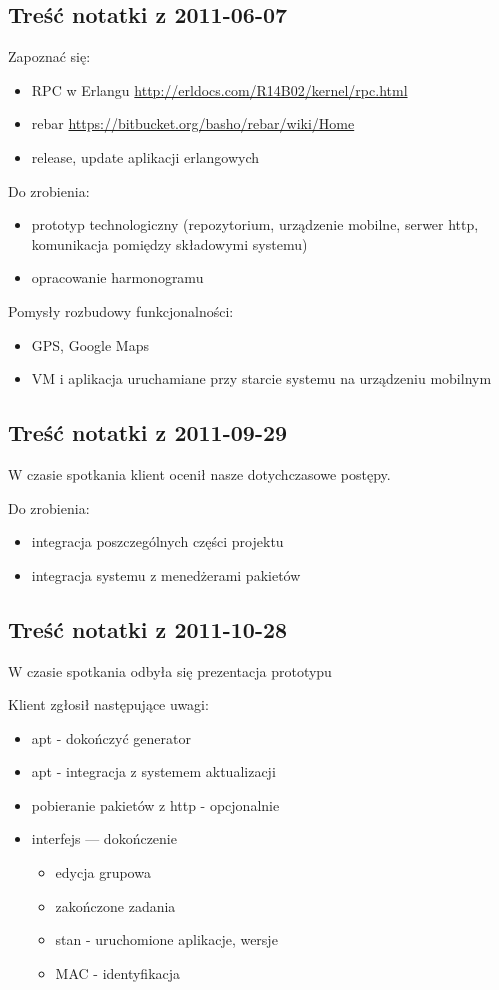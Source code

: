 \documentclass[polish,12pt]{aghthesis} \usepackage[utf8]{inputenc}
\begin{document}
\subsection{Treść notatki z 2011-06-07}
Zapoznać się:
\begin{itemize}
\item RPC w Erlangu \url{http://erldocs.com/R14B02/kernel/rpc.html}
\item rebar \url{https://bitbucket.org/basho/rebar/wiki/Home}
\item release, update aplikacji erlangowych
\end{itemize}
Do zrobienia:
\begin{itemize}
\item prototyp technologiczny (repozytorium, urządzenie mobilne, serwer http, komunikacja pomiędzy składowymi systemu)
\item opracowanie harmonogramu
\end{itemize}
Pomysły rozbudowy funkcjonalności:
\begin{itemize}
\item GPS, Google Maps
\item VM i aplikacja uruchamiane przy starcie systemu na urządzeniu mobilnym
\end{itemize}
\subsection{Treść notatki z 2011-09-29}
W czasie spotkania klient ocenił nasze dotychczasowe postępy.

Do zrobienia:
\begin{itemize}
\item integracja poszczególnych części projektu
\item integracja systemu z menedżerami pakietów
\end{itemize}

\subsection{Treść notatki z 2011-10-28}
W czasie spotkania odbyła się prezentacja prototypu

Klient zgłosił następujące uwagi:
\begin{itemize}
  \item apt - dokończyć generator
  \item apt - integracja z systemem aktualizacji
  \item pobieranie pakietów z http - opcjonalnie
  \item interfejs --- dokończenie
    \begin{itemize}
    \item edycja grupowa
    \item zakończone zadania
    \item stan - uruchomione aplikacje, wersje
    \item MAC - identyfikacja
    \end{itemize}
\end{itemize}
\end{document}
